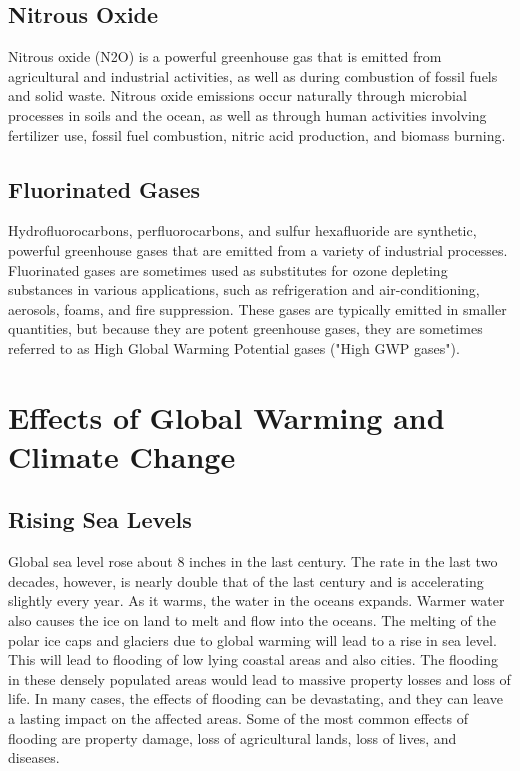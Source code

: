 \documentclass{article}
\begin{document}
\subsection{Nitrous Oxide}
Nitrous oxide (N2O) is a powerful greenhouse gas that is emitted from
agricultural and industrial activities, as well as during combustion of fossil
fuels and solid waste. Nitrous oxide emissions occur naturally through
microbial processes in soils and the ocean, as well as through human activities
involving fertilizer use, fossil fuel combustion, nitric acid production, and
biomass burning.

\subsection{Fluorinated Gases}
Hydrofluorocarbons, perfluorocarbons, and sulfur hexafluoride are synthetic,
powerful greenhouse gases that are emitted from a variety of industrial
processes. Fluorinated gases are sometimes used as substitutes for ozone
depleting substances in various applications, such as refrigeration and
air-conditioning, aerosols, foams, and fire suppression. These gases are
typically emitted in smaller quantities, but because they are potent greenhouse
gases, they are sometimes referred to as High Global Warming Potential gases
("High GWP gases").

\section{Effects of Global Warming and Climate Change}
\subsection{Rising Sea Levels}
Global sea level rose about 8 inches in the last century. The rate in the last
two decades, however, is nearly double that of the last century and is
accelerating slightly every year. As it warms, the water in the oceans expands.
Warmer water also causes the ice on land to melt and flow into the oceans. The
melting of the polar ice caps and glaciers due to global warming will lead to a
rise in sea level. This will lead to flooding of low lying coastal areas and
also cities. The flooding in these densely populated areas would lead to
massive property losses and loss of life. In many cases, the effects of
flooding can be devastating, and they can leave a lasting impact on the
affected areas. Some of the most common effects of flooding are property
damage, loss of agricultural lands, loss of lives, and diseases.
\end{document}
